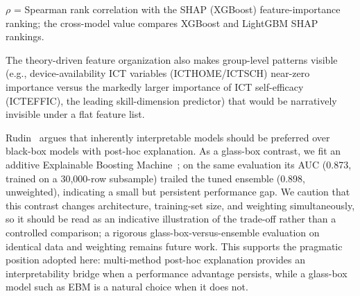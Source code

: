 \documentclass[journal]{IEEEtran}
\begin{document}
\begin{table}[!t]
\centering
\caption{XAI Method-Selection Guidance for Correlated Educational Survey Data}
\label{tab:xai-guidance}
\footnotesize
{}
\vspace{2pt}
{\footnotesize $\rho$ = Spearman rank correlation with the SHAP (XGBoost) feature-importance ranking; the cross-model value compares XGBoost and LightGBM SHAP rankings.}
\end{table} The theory-driven feature organization also makes group-level patterns visible (e.g., device-availability ICT variables (ICTHOME/ICTSCH) near-zero importance versus the markedly larger importance of ICT self-efficacy (ICTEFFIC), the leading skill-dimension predictor) that would be narratively invisible under a flat feature list.

Rudin~\cite{Rudin_2019} argues that inherently interpretable models should be preferred over black-box models with post-hoc explanation. As a glass-box contrast, we fit an additive Explainable Boosting Machine~\cite{nori2019interpretml}; on the same evaluation its AUC (0.873, trained on a 30,000-row subsample) trailed the tuned ensemble (0.898, unweighted), indicating a small but persistent performance gap. We caution that this contrast changes architecture, training-set size, and weighting simultaneously, so it should be read as an indicative illustration of the trade-off rather than a controlled comparison; a rigorous glass-box-versus-ensemble evaluation on identical data and weighting remains future work. This supports the pragmatic position adopted here: multi-method post-hoc explanation provides an interpretability bridge when a performance advantage persists, while a glass-box model such as EBM is a natural choice when it does not.
\end{document}
